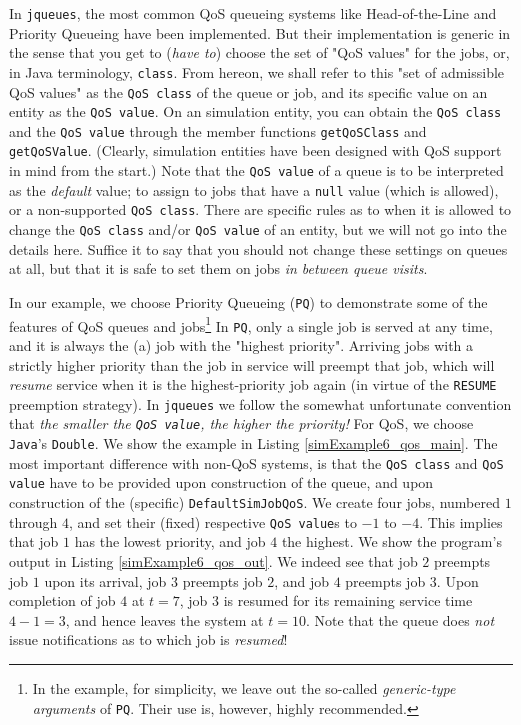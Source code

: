 \documentclass[12pt]{book}
\begin{document}
In \lstinline-jqueues-, 
  the most common QoS queueing systems
  like Head-of-the-Line and Priority Queueing
  have been implemented.
But their implementation is generic in the sense that
  you get to ({\em have to\/})
  choose the set of "QoS values" for the jobs,
  or, in Java terminology,
  \lstinline|class|.
From hereon,
  we shall refer to this "set of admissible QoS values"
  as the \lstinline|QoS class|
  of the queue or job,
  and its specific value on an entity
  as the \lstinline|QoS value|.
On an simulation entity,
  you can obtain the \lstinline|QoS class|
  and the \lstinline|QoS value|
  through the member functions
  \lstinline|getQoSClass| and \lstinline|getQoSValue|.
(Clearly,
  simulation entities have been designed
  with QoS support in mind
  from the start.)
Note that the \lstinline|QoS value| of a queue
  is to be interpreted as
  the {\em default\/} value;
  to assign to jobs that have a \lstinline|null|
  value (which is allowed),
  or a non-supported \lstinline|QoS class|.
There are specific rules as to when it is allowed
  to change the \lstinline|QoS class|
  and/or \lstinline|QoS value|
  of an entity, but we will not go into the details here.
Suffice it to say that you should not change these
  settings on queues at all,
  but that it is safe to set them on jobs
  {\em in between queue visits}.

In our example, we choose Priority Queueing (\lstinline|PQ|)
  to demonstrate some of the features of QoS queues and jobs\footnote{
In the example, for simplicity,
  we leave out the so-called {\em generic-type arguments\/}
  of \lstinline|PQ|.
Their use is, however, highly recommended.}
In \lstinline|PQ|,
  only a single job is served at any time,
  and it is always the (a) job with the "highest priority".
Arriving jobs with a strictly higher priority
  than the job in service will preempt that job,
  which will {\em resume\/} service when it is the
  highest-priority job again
  (in virtue of the \lstinline|RESUME|
   preemption strategy).
In \lstinline|jqueues| we follow
  the somewhat unfortunate convention
  that {\em the smaller the \lstinline|QoS value|,
  the higher the priority!\/}
For QoS, we choose \lstinline|Java|'s \lstinline|Double|.
We show the example in Listing \ref{simExample6_qos_main}.
The most important difference with non-QoS systems,
  is that the \lstinline|QoS class|
  and \lstinline|QoS value| have to be provided upon construction
  of the queue, and upon construction of the
  (specific) \lstinline|DefaultSimJobQoS|.
We create four jobs, numbered $1$ through $4$,
  and set their (fixed) respective \lstinline|QoS value|s
  to $-1$ to $-4$.
This implies that job $1$ has the lowest priority,
  and job $4$ the highest.
We show the program's output in Listing \ref{simExample6_qos_out}.
We indeed see that job $2$ preempts job $1$ upon its arrival,
  job $3$ preempts job $2$, and job $4$ preempts job $3$.
Upon completion of job $4$ at $t=7$,
  job $3$ is resumed for its remaining service time $4-1=3$,
  and hence leaves the system at $t=10$.
Note that the queue does {\em not\/} issue notifications
  as to which job is {\em resumed\/}!
\end{document}
